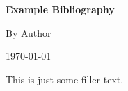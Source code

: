 \documentclass{article}
\begin{document}
\begin{center}
   {\Large\textbf{Example Bibliography}}
\medskip

   {\large By Author
\medskip

\medskip

           \today
   }
\end{center}
This is just some filler text.\cite{caro1975power}
\nocite{*} %
\printbibliography
\end{document}
